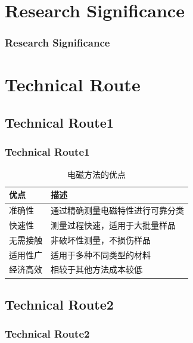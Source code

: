 \documentclass{beamer}
\begin{document}
{\begin{frame}
\begin{columns}[T]
  \end{columns}


\end{frame}
\section{Research Significance}
\begin{frame}
  \frametitle{Research Significance}

    
\end{frame}
\section{Technical Route}
\subsection{Technical Route1}
\begin{frame}
  \frametitle{Technical Route1}

\begin{table}[h]
        \centering
        \begin{tabular}{|l|l|}
          \hline
          \textbf{优点} & \textbf{描述} \\
          \hline
          准确性 & 通过精确测量电磁特性进行可靠分类 \\
          \hline
          快速性 & 测量过程快速，适用于大批量样品 \\
          \hline
          无需接触 & 非破坏性测量，不损伤样品 \\
          \hline
          适用性广 & 适用于多种不同类型的材料 \\
          \hline
          经济高效 & 相较于其他方法成本较低 \\
          \hline
        \end{tabular}
        \caption{电磁方法的优点}
      \end{table}
\end{frame}
\subsection{Technical Route2}
\begin{frame}
 \frametitle{Technical Route2}


\end{frame}}
\end{document}
